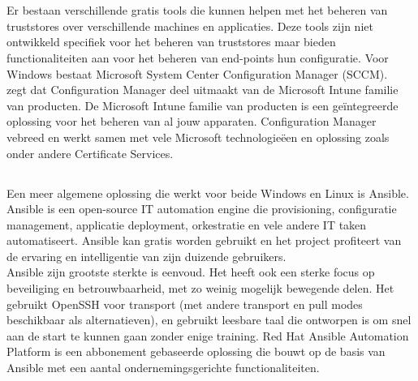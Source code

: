 \pagebreak

\section{}%
\label{sec:Bestaande tools}

\subsection{}
\label{subsec:System_Center_Configuration_Manager}

Er bestaan verschillende gratis tools die kunnen helpen met het beheren van truststores over verschillende machines en applicaties.
Deze tools zijn niet ontwikkeld specifiek voor het beheren van truststores maar bieden functionaliteiten aan voor het beheren van end-points hun configuratie.
Voor Windows bestaat Microsoft System Center Configuration Manager (SCCM). \\

\textcite{ConfigMan} zegt dat Configuration Manager deel uitmaakt van de Microsoft Intune familie van producten. De Microsoft Intune familie van producten is een geïntegreerde oplossing voor het beheren van al jouw apparaten.
Configuration Manager vebreed en werkt samen met vele Microsoft technologieëen en oplossing zoals onder andere Certificate Services. \\

\subsection{}
\label{subsec:Ansible}

Een meer algemene oplossing die werkt voor beide Windows en Linux is Ansible.
Ansible is een open-source IT automation engine die provisioning, configuratie management, applicatie deployment, orkestratie en vele andere IT taken automatiseert.
Ansible kan gratis worden gebruikt en het project profiteert van de ervaring en intelligentie van zijn duizende gebruikers. \autocite{Ansible} \\

Ansible zijn grootste sterkte is eenvoud. Het heeft ook een sterke focus op beveiliging en betrouwbaarheid, met zo weinig mogelijk bewegende delen. Het gebruikt OpenSSH voor transport (met andere transport en pull modes beschikbaar als alternatieven), en gebruikt leesbare taal die ontworpen is om snel aan de start te kunnen gaan zonder enige training.
Red Hat Ansible Automation Platform is een abbonement gebaseerde oplossing die bouwt op de basis van Ansible met een aantal ondernemingsgerichte functionaliteiten. \\

